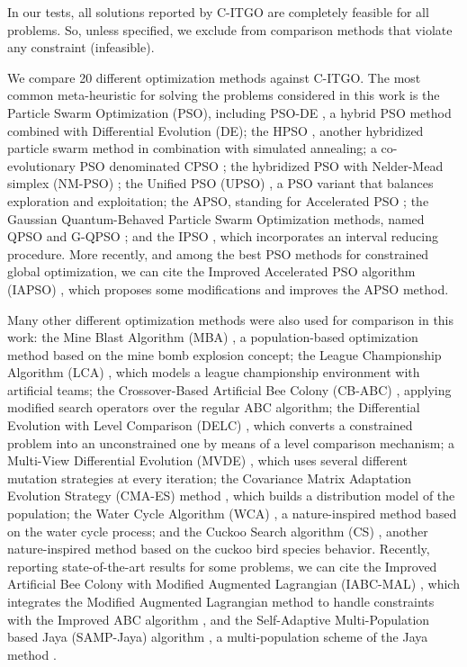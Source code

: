 


In our tests, all solutions reported by C-ITGO are completely feasible for all problems. So, unless specified, we exclude from comparison methods that violate any constraint (infeasible).

We compare 20 different optimization methods against C-ITGO. The most common meta-heuristic for solving the problems considered in this work is the Particle Swarm Optimization (PSO), including PSO-DE \citep{PSO-DE}, a hybrid PSO method combined with Differential Evolution (DE); the HPSO \citep{HPSO}, another hybridized particle swarm method in combination with simulated annealing; a co-evolutionary PSO denominated CPSO \citep{CPSO}; the hybridized PSO with Nelder-Mead simplex (NM-PSO) \citep{NM-PSO}; the Unified PSO (UPSO) \citep{UPSO}, a PSO variant that balances exploration and exploitation; the APSO, standing for Accelerated PSO  \citep{APSO}; the Gaussian Quantum-Behaved Particle Swarm Optimization methods, named QPSO and G-QPSO \citep{QPSO}; and the IPSO \citep{IPSO}, which incorporates an interval reducing procedure. More recently, and among the best PSO methods for constrained global optimization, we can cite the Improved Accelerated PSO algorithm (IAPSO) \citep{IAPSO}, which proposes some modifications and improves the APSO method.

Many other different optimization methods were also used for comparison in this work: the Mine Blast Algorithm (MBA) \citep{MBA}, a population-based optimization method based on the mine bomb explosion concept; the League Championship Algorithm (LCA) \citep{LCA}, which models a league championship environment with artificial teams; the Crossover-Based Artificial Bee Colony (CB-ABC) \citep{CB-ABC}, applying modified search operators over the regular ABC algorithm; the Differential Evolution with Level Comparison (DELC) \citep{DELC}, which converts a constrained problem into an unconstrained one by means of a level comparison mechanism; a Multi-View Differential Evolution (MVDE) \citep{MVDE}, which uses several different mutation strategies at every iteration; the Covariance Matrix Adaptation Evolution Strategy (CMA-ES) method \citep{CMA-ES}, which builds a distribution model of the population; the Water Cycle Algorithm (WCA) \citep{WCA}, a nature-inspired method based on the water cycle process; and the Cuckoo Search algorithm (CS) \citep{CS}, another nature-inspired method based on the cuckoo bird species behavior. Recently, reporting state-of-the-art results for some problems, we can cite the Improved Artificial Bee Colony with Modified Augmented Lagrangian (IABC-MAL) \citep{IABC-Mal}, which integrates the Modified Augmented Lagrangian method to handle constraints with the Improved ABC algorithm \citep{IABC}, and the Self-Adaptive Multi-Population based Jaya (SAMP-Jaya) algorithm \citep{SAMP-Jaya}, a multi-population scheme of the Jaya method \citep{Jaya}.


